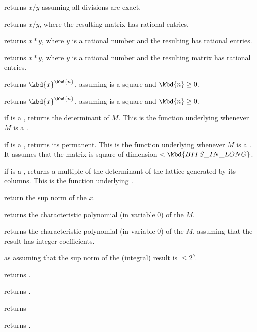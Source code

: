  returns $x/y$ assuming all divisions
are exact.

 returns $x/y$, where the resulting matrix
has rational entries.

 returns $x*y$, where $y$ is a rational number
and the resulting  has rational entries.

 returns $x*y$, where $y$ is a rational number
and the resulting matrix has rational entries.

 returns $\kbd{x}^\kbd{n}$, assuming 
is a square  and $\kbd{n}\geq 0$.

 returns $\kbd{x}^\kbd{n}$, assuming 
is a square  and $\kbd{n}\geq 0$.

 if  is a , returns the determinant of
$M$. This is the function underlying  whenever $M$ is a .

 if  is a , returns its
permanent. This is the function underlying  whenever $M$
is a . It assumes that the matrix is square of dimension $<
\kbd{BITS\_IN\_LONG}$.

 if  is a , returns a multiple of
the determinant of the lattice generated by its columns. This is the function
underlying .

 return the sup norm of the  $x$.

 returns the characteristic polynomial (in
variable $0$) of the  $M$.

 returns the characteristic polynomial
(in variable $0$) of the  $M$, assuming that the result has integer
coefficients.

 as 
assuming that the sup norm of the (integral) result is $\leq 2^b$.

 returns .

 returns .

 returns 

 returns .

